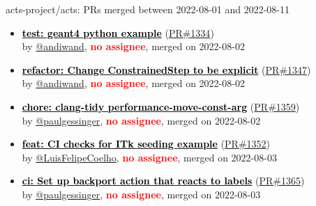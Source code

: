 \begin{frame}[allowframebreaks]{ acts-project/acts: PRs merged 
between 2022-08-01 and 2022-08-11
}
\begin{itemize}
    \item\prmerged
    \hspace*{0.1em}
    \textbf{\href{https://github.com/acts-project/acts/pull/1334}{\textcolor{black}{test: geant4 python example}}}
    (\href{https://github.com/acts-project/acts/pull/1334}{PR\#1334}) \\
    by \href{https://github.com/andiwand}{@andiwand}, {}\textbf{\textcolor{Red}{no assignee}}, merged on 2022-08-02

    \item\prmerged
    \hspace*{0.1em}
    \textbf{\href{https://github.com/acts-project/acts/pull/1347}{\textcolor{black}{refactor: Change ConstrainedStep to be explicit}}}
    (\href{https://github.com/acts-project/acts/pull/1347}{PR\#1347}) \\
    by \href{https://github.com/andiwand}{@andiwand}, {}\textbf{\textcolor{Red}{no assignee}}, merged on 2022-08-02

    \item\prmerged
    \hspace*{0.1em}
    \textbf{\href{https://github.com/acts-project/acts/pull/1359}{\textcolor{black}{chore: clang-tidy performance-move-const-arg}}}
    (\href{https://github.com/acts-project/acts/pull/1359}{PR\#1359}) \\
    by \href{https://github.com/paulgessinger}{@paulgessinger}, {}\textbf{\textcolor{Red}{no assignee}}, merged on 2022-08-02

    \item\prmerged
    \hspace*{0.1em}
    \textbf{\href{https://github.com/acts-project/acts/pull/1352}{\textcolor{black}{feat: CI checks for ITk seeding example}}}
    (\href{https://github.com/acts-project/acts/pull/1352}{PR\#1352}) \\
    by \href{https://github.com/LuisFelipeCoelho}{@LuisFelipeCoelho}, {}\textbf{\textcolor{Red}{no assignee}}, merged on 2022-08-03

    \item\prmerged
    \hspace*{0.1em}
    \textbf{\href{https://github.com/acts-project/acts/pull/1365}{\textcolor{black}{ci: Set up backport action that reacts to labels}}}
    (\href{https://github.com/acts-project/acts/pull/1365}{PR\#1365}) \\
    by \href{https://github.com/paulgessinger}{@paulgessinger}, {}\textbf{\textcolor{Red}{no assignee}}, merged on 2022-08-03


\end{itemize}
\end{frame}
